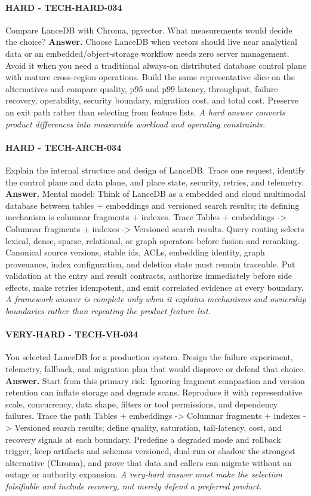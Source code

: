 \paragraph{HARD - TECH-HARD-034} Compare LanceDB with Chroma, pgvector. What measurements would decide the choice?
\textbf{Answer.} Choose LanceDB when vectors should live near analytical data or an embedded/object-storage workflow needs zero server management. Avoid it when you need a traditional always-on distributed database control plane with mature cross-region operations. Build the same representative slice on the alternatives and compare quality, p95 and p99 latency, throughput, failure recovery, operability, security boundary, migration cost, and total cost. Preserve an exit path rather than selecting from feature lists.
\textit{A hard answer converts product differences into measurable workload and operating constraints.}
\paragraph{HARD - TECH-ARCH-034} Explain the internal structure and design of LanceDB. Trace one request, identify the control plane and data plane, and place state, security, retries, and telemetry.
\textbf{Answer.} Mental model: Think of LanceDB as a embedded and cloud multimodal database between tables + embeddings and versioned search results; its defining mechanism is columnar fragments + indexes. Trace Tables + embeddings -> Columnar fragments + indexes -> Versioned search results. Query routing selects lexical, dense, sparse, relational, or graph operators before fusion and reranking. Canonical source versions, stable ids, ACLs, embedding identity, graph provenance, index configuration, and deletion state must remain traceable. Put validation at the entry and result contracts, authorize immediately before side effects, make retries idempotent, and emit correlated evidence at every boundary.
\textit{A framework answer is complete only when it explains mechanisms and ownership boundaries rather than repeating the product feature list.}
\paragraph{VERY-HARD - TECH-VH-034} You selected LanceDB for a production system. Design the failure experiment, telemetry, fallback, and migration plan that would disprove or defend that choice.
\textbf{Answer.} Start from this primary risk: Ignoring fragment compaction and version retention can inflate storage and degrade scans. Reproduce it with representative scale, concurrency, data shape, filters or tool permissions, and dependency failures. Trace the path Tables + embeddings -> Columnar fragments + indexes -> Versioned search results; define quality, saturation, tail-latency, cost, and recovery signals at each boundary. Predefine a degraded mode and rollback trigger, keep artifacts and schemas versioned, dual-run or shadow the strongest alternative (Chroma), and prove that data and callers can migrate without an outage or authority expansion.
\textit{A very-hard answer must make the selection falsifiable and include recovery, not merely defend a preferred product.}
